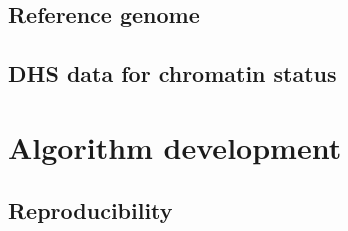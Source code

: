 \subsection{Reference genome} 

\subsection{DHS data for chromatin status} 

\section{Algorithm development}\label{methods:code}
\subsection{Reproducibility} 

